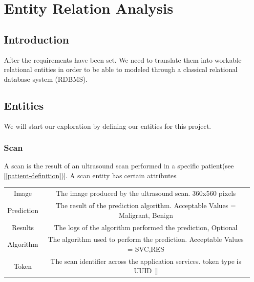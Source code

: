 \chapter{Entity Relation Analysis}
	\section{Introduction}
	After the requirements have been set. We need to translate them into workable relational entities in order to be able to modeled through a classical
	relational database system (RDBMS).
	\section{Entities}
	We will start our exploration by defining our entities for this project.
	\subsection{Scan}
	A scan is the result of an ultrasound scan performed in a specific patient(see [\ref{patient-definition})]. A scan entity has certain attributes
	\begin{center}
		\begin{tabular}{ |c|c| } 
			\hline
			Image & The image produced by the ultrasound scan. 360x560 pixels\\
			Prediction & The result of the prediction algorithm. Acceptable Values = {Maligrant, Benign}  \\
			Results & The logs of the algorithm performed the prediction, Optional \\
			Algorithm & The algorithm used to perform the prediction. Acceptable Values = {SVC,RES} \\
			Token& The scan identifier across the application services. token type is UUID [\cite{rfc4122}] \\
			\hline
		\end{tabular}
	\end{center}

